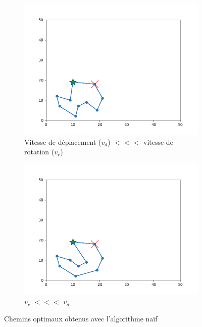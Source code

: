 \documentclass[12pt]{article}
\begin{document}
    \begin{figure}[H]
        \centering
        \begin{subfigure}{0.35\textwidth}
          \centering
          \includegraphics[width=\linewidth]{img/3od}
          \caption{Vitesse de déplacement ($v_d$) $<<<$ vitesse de rotation ($v_r$)}
          \label{subfig:terrain3od}
        \end{subfigure}
        \hfill
        \begin{subfigure}{0.35\textwidth}
          \centering
          \includegraphics[width=\linewidth]{img/3or}
          \caption{$v_r$ $<<<$ $v_d$}
          \label{subfig:terrain3or}
        \end{subfigure}
        \caption{Chemins optimaux obtenus avec l'algorithme naïf}
        \label{fig:terrain3opt}
    \end{figure}
\end{document}

